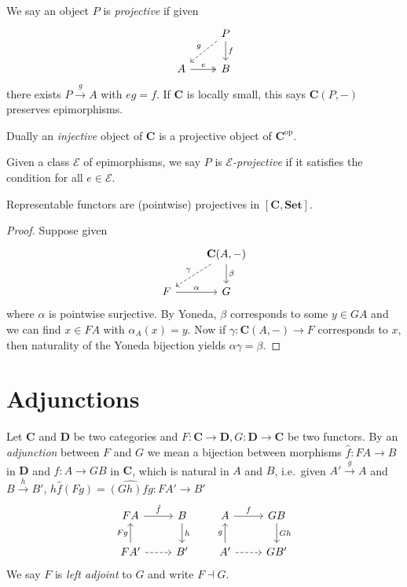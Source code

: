 \documentclass[a4paper]{article}
\renewcommand{\c}[1]{\mathbf{#1}}
\newcommand{\Set}{{\c{Set}}}
\newcommand{\adjoint}{\dashv}
\begin{document}
\begin{definition}
  We say an object \(P\) is \emph{projective} if given
  \[
    \begin{tikzcd}
      & P \ar[d, "f"] \ar[dl, "g"', dashed] \\
      A \ar[r, "e", twoheadrightarrow] & B
    \end{tikzcd}
  \]
  there exists \(P \xrightarrow{g} A\) with \(eg = f\). If \(\c C\) is locally small, this says \(\c C(P, -)\) preserves epimorphisms.

  Dually an \emph{injective} object of \(\c C\) is a projective object of \(\c C^{\text{op}}\).

  Given a class \(\mathcal E\) of epimorphisms, we say \(P\) is \emph{\(\mathcal E\)-projective} if it satisfies the condition for all \(e \in \mathcal E\).
\end{definition}

\begin{lemma}
  Representable functors are (pointwise) projectives in \([\c C, \Set]\).
\end{lemma}

\begin{proof}
  Suppose given
  \[
    \begin{tikzcd}
      & \c C(A, -) \ar[d, "\beta"] \ar[dl, "\gamma"', dashed]\\
      F \ar[r, "\alpha"] & G
    \end{tikzcd}
  \]
  where \(\alpha\) is pointwise surjective. By Yoneda, \(\beta\) corresponds to some \(y \in GA\) and we can find \(x \in FA\) with \(\alpha_A(x) = y\). Now if \(\gamma: \c C(A, -) \to F\) corresponds to \(x\), then naturality of the Yoneda bijection yields \(\alpha\gamma = \beta\).
\end{proof}

\section{Adjunctions}

\begin{definition}[adjunction]
  Let \(\c C\) and \(\c D\) be two categories and \(F: \c C \to \c D, G: \c D \to \c C\) be two functors. By an \emph{adjunction} between \(F\) and \(G\) we mean a bijection between morphisms \(\hat f: FA \to B\) in \(\c D\) and \(f: A \to GB\) in \(\c C\), which is natural in \(A\) and \(B\), i.e.\ given \(A' \xrightarrow{g} A\) and \(B \xrightarrow{h} B'\), \(h \hat f(Fg) = \widehat{(Gh) fg}: FA' \to B'\)
  \[
    \begin{tikzcd}
      FA \ar[r, "\hat f"] & B \ar[d, "h"] \\
      FA' \ar[u, "Fg"] \ar[r, dashed] & B'
    \end{tikzcd}
    \qquad
    \begin{tikzcd}
      A \ar[r, "f"] & GB \ar[d, "Gh"] \\
      A' \ar[u, "g"] \ar[r, dashed] & GB'
    \end{tikzcd}
  \]
  We say \(F\) is \emph{left adjoint} to \(G\) and write \(F \adjoint G\).
\end{definition}
\end{document}
